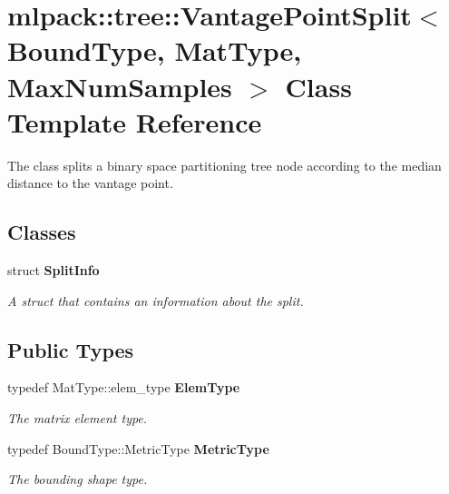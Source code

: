 \section{mlpack\+:\+:tree\+:\+:Vantage\+Point\+Split$<$ Bound\+Type, Mat\+Type, Max\+Num\+Samples $>$ Class Template Reference}
\label{classmlpack_1_1tree_1_1VantagePointSplit}


The class splits a binary space partitioning tree node according to the median distance to the vantage point.  


\subsection*{Classes}
\begin{DoxyCompactItemize}
\item 
struct {\bf Split\+Info}
\begin{DoxyCompactList}\small\item\em A struct that contains an information about the split. \end{DoxyCompactList}\end{DoxyCompactItemize}
\subsection*{Public Types}
\begin{DoxyCompactItemize}
\item 
typedef Mat\+Type\+::elem\+\_\+type {\bf Elem\+Type}
\begin{DoxyCompactList}\small\item\em The matrix element type. \end{DoxyCompactList}\item 
typedef Bound\+Type\+::\+Metric\+Type {\bf Metric\+Type}
\begin{DoxyCompactList}\small\item\em The bounding shape type. \end{DoxyCompactList}\end{DoxyCompactItemize}
